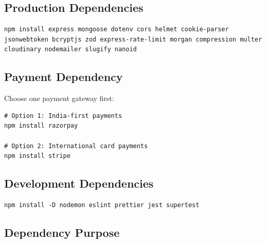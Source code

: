 \documentclass[11pt,a4paper]{article}
\begin{document}
\subsection{Production Dependencies}

\begin{lstlisting}[style=code]
npm install express mongoose dotenv cors helmet cookie-parser jsonwebtoken bcryptjs zod express-rate-limit morgan compression multer cloudinary nodemailer slugify nanoid
\end{lstlisting}

\subsection{Payment Dependency}

Choose one payment gateway first:

\begin{lstlisting}[style=code]
# Option 1: India-first payments
npm install razorpay

# Option 2: International card payments
npm install stripe
\end{lstlisting}

\subsection{Development Dependencies}

\begin{lstlisting}[style=code]
npm install -D nodemon eslint prettier jest supertest
\end{lstlisting}

\subsection{Dependency Purpose}
\end{document}
